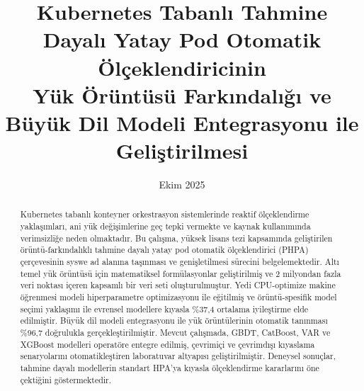 \documentclass[12pt,a4paper]{article}
\title{Kubernetes Tabanlı Tahmine Dayalı Yatay Pod Otomatik Ölçeklendiricinin\\Yük Örüntüsü Farkındalığı ve Büyük Dil Modeli Entegrasyonu ile Geliştirilmesi}
\author{}
\date{Ekim 2025}
\begin{document}
\maketitle

\begin{abstract}
Kubernetes tabanlı konteyner orkestrasyon sistemlerinde reaktif ölçeklendirme yaklaşımları, ani yük değişimlerine geç tepki vermekte ve kaynak kullanımında verimsizliğe neden olmaktadır. Bu çalışma, yüksek lisans tezi kapsamında geliştirilen örüntü-farkındalıklı tahmine dayalı yatay pod otomatik ölçeklendirici (PHPA) çerçevesinin syswe ad alanına taşınması ve genişletilmesi sürecini belgelemektedir. Altı temel yük örüntüsü için matematiksel formülasyonlar geliştirilmiş ve 2 milyondan fazla veri noktası içeren kapsamlı bir veri seti oluşturulmuştur. Yedi CPU-optimize makine öğrenmesi modeli hiperparametre optimizasyonu ile eğitilmiş ve örüntü-spesifik model seçimi yaklaşımı ile evrensel modellere kıyasla \%37,4 ortalama iyileştirme elde edilmiştir. Büyük dil modeli entegrasyonu ile yük örüntülerinin otomatik tanınması \%96,7 doğrulukla gerçekleştirilmiştir. Mevcut çalışmada, GBDT, CatBoost, VAR ve XGBoost modelleri operatöre entegre edilmiş, çevrimiçi ve çevrimdışı kıyaslama senaryolarını otomatikleştiren laboratuvar altyapısı geliştirilmiştir. Deneysel sonuçlar, tahmine dayalı modellerin standart HPA'ya kıyasla ölçeklendirme kararlarını öne çektiğini göstermektedir.
\end{abstract}








\end{document}
